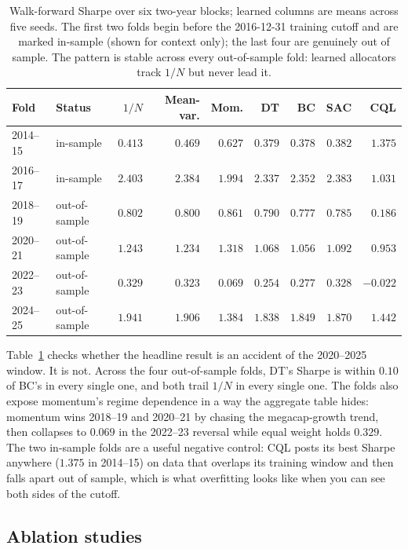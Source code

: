 \documentclass[11pt]{article}
\begin{document}
\begin{table}[t]
\centering
\caption{Walk-forward Sharpe over six two-year blocks; learned columns are means across five
seeds. The first two folds begin before the 2016-12-31 training cutoff and are marked
in-sample (shown for context only); the last four are genuinely out of sample. The pattern is
stable across every out-of-sample fold: learned allocators track $1/N$ but never lead it.}
\label{tab:walkforward}
\small
\begin{tabular}{llrrrrrrr}
\toprule
Fold & Status & $1/N$ & Mean-var. & Mom. & DT & BC & SAC & CQL \\
\midrule
2014--15 & in-sample     & $0.413$ & $0.469$ & $0.627$ & $0.379$ & $0.378$ & $0.382$ & $1.375$ \\
2016--17 & in-sample     & $2.403$ & $2.384$ & $1.994$ & $2.337$ & $2.352$ & $2.383$ & $1.031$ \\
\midrule
2018--19 & out-of-sample & $0.802$ & $0.800$ & $\mathbf{0.861}$ & $0.790$ & $0.777$ & $0.785$ & $0.186$ \\
2020--21 & out-of-sample & $1.243$ & $1.234$ & $\mathbf{1.318}$ & $1.068$ & $1.056$ & $1.092$ & $0.953$ \\
2022--23 & out-of-sample & $\mathbf{0.329}$ & $0.323$ & $0.069$ & $0.254$ & $0.277$ & $0.328$ & $-0.022$ \\
2024--25 & out-of-sample & $\mathbf{1.941}$ & $1.906$ & $1.384$ & $1.838$ & $1.849$ & $1.870$ & $1.442$ \\
\bottomrule
\end{tabular}
\end{table}

Table~\ref{tab:walkforward} checks whether the headline result is an accident of the 2020--2025
window. It is not. Across the four out-of-sample folds, DT's Sharpe is within $0.10$ of BC's in
every single one, and both trail $1/N$ in every single one. The folds also expose momentum's
regime dependence in a way the aggregate table hides: momentum wins 2018--19 and 2020--21 by
chasing the megacap-growth trend, then collapses to $0.069$ in the 2022--23 reversal while
equal weight holds $0.329$. The two in-sample folds are a useful negative control: CQL posts
its best Sharpe anywhere ($1.375$ in 2014--15) on data that overlaps its training window and
then falls apart out of sample, which is what overfitting looks like when you can see both
sides of the cutoff.

\subsection{Ablation studies}
\label{sec:ablations}
\end{document}
